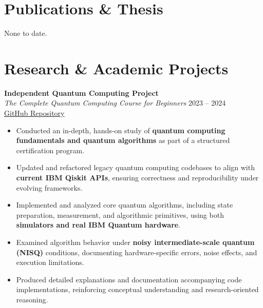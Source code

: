\documentclass[a4paper,10pt]{article}
\begin{document}
\section*{Publications \& Thesis}
None to date.

\section*{Research \& Academic Projects}

\textbf{Independent Quantum Computing Project} \\
\textit{The Complete Quantum Computing Course for Beginners} \hfill 2023 -- 2024 \\
\href{https://github.com/prabeshkunwar12/The-Complete-Quantum-Computing-Course-for-Beginners-}{GitHub Repository}
\begin{itemize}
    \item Conducted an in-depth, hands-on study of \textbf{quantum computing fundamentals and quantum algorithms} as part of a structured certification program.
    \item Updated and refactored legacy quantum computing codebases to align with \textbf{current IBM Qiskit APIs}, ensuring correctness and reproducibility under evolving frameworks.
    \item Implemented and analyzed core quantum algorithms, including state preparation, measurement, and algorithmic primitives, using both \textbf{simulators and real IBM Quantum hardware}.
    \item Examined algorithm behavior under \textbf{noisy intermediate-scale quantum (NISQ)} conditions, documenting hardware-specific errors, noise effects, and execution limitations.
    \item Produced detailed explanations and documentation accompanying code implementations, reinforcing conceptual understanding and research-oriented reasoning.
\end{itemize}
\end{document}
